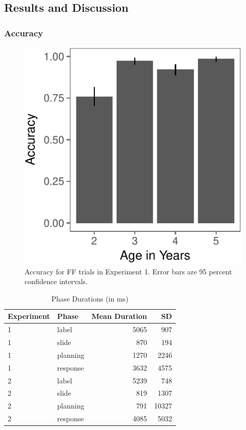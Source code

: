 \documentclass[english,man]{apa6}
\theoremstyle{definition}
\theoremstyle{definition}
\theoremstyle{definition}
\theoremstyle{remark}
\begin{document}
\subsection{Results and Discussion}\label{results-and-discussion}

\subsubsection{Accuracy}\label{accuracy}

\begin{figure}[htbp]
\centering
\includegraphics{figs/acce1-1.pdf}
\caption{\label{fig:acce1}Accuracy for FF trials in Experiment 1. Error bars
are 95 percent confidence intervals.}
\end{figure}

\begin{table}[b]
\centering
\begin{tabular}{llrr}
  \hline
Experiment & Phase & Mean Duration & SD \\ 
  \hline
1 & label & 5065 & 907 \\ 
  1 & slide & 870 & 194 \\ 
  1 & planning & 1270 & 2246 \\ 
  1 & response & 3632 & 4575 \\ 
   \hline
2 & label & 5239 & 748 \\ 
  2 & slide & 819 & 1307 \\ 
  2 & planning & 791 & 10327 \\ 
  2 & response & 4085 & 5032 \\ 
   \hline
\end{tabular}
\caption{Phase Durations (in ms)} 
\label{tab:phases}
\end{table}
\end{document}

